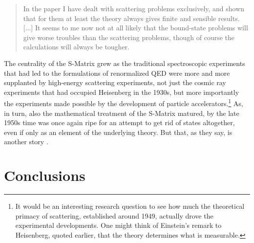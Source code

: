 \documentclass[12pt]{article}
\begin{document}
\begin{quote}
In the paper I have dealt with scattering problems exclusively, and shown that for them at least the theory always gives finite and sensible results. [...] It seems to me now not at all likely that the bound-state problems will give worse troubles than the scattering problems, though of course the calculations will always be tougher.
\end{quote}

The centrality of the S-Matrix grew as the traditional spectroscopic experiments that had led to the formulations of renormalized QED were more and more supplanted by high-energy scattering experiments, not just the cosmic ray experiments that had occupied Heisenberg in the 1930s, but more importantly the experiments made possible by the development of particle accelerators.\footnote{It would be an interesting research question to see how much the theoretical primacy of scattering, established around 1949, actually drove the experimental developments. One might think of Einstein's remark to Heisenberg, quoted earlier, that the theory determines what is measurable.} As, in turn, also the mathematical treatment of the S-Matrix matured, by the late 1950s time was once again ripe for an attempt to get rid of states altogether, even if only as an element of the underlying theory. But that, as they say, is another story \citep{cushing_1990_theory}.

\section{Conclusions}
\end{document}
